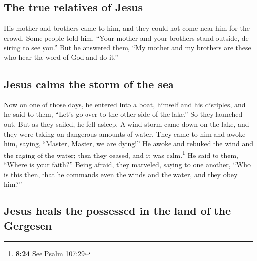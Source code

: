\begin{paracol}{2}
\begin{otherlanguage}{english}
\hypertarget{the-true-relatives-of-jesus}{%
\subsection{The true relatives of
Jesus}\label{the-true-relatives-of-jesus}}

 His mother and brothers came to him, and they could not
come near him for the crowd.  Some people told him,
``Your mother and your brothers stand outside, desiring to see you.''
 But he answered them, ``My mother and my brothers are
these who hear the word of God and do it.''

\hypertarget{jesus-calms-the-storm-of-the-sea}{%
\subsection{Jesus calms the storm of the
sea}\label{jesus-calms-the-storm-of-the-sea}}

 Now on one of those days, he entered into a boat,
himself and his disciples, and he said to them, ``Let's go over to the
other side of the lake.'' So they launched out.  But as
they sailed, he fell asleep. A wind storm came down on the lake, and
they were taking on dangerous amounts of water.  They
came to him and awoke him, saying, ``Master, Master, we are dying!'' He
awoke and rebuked the wind and the raging of the water; then they
ceased, and it was calm.\footnote{\textbf{8:24} See Psalm 107:29}
 He said to them, ``Where is your faith?'' Being afraid,
they marveled, saying to one another, ``Who is this then, that he
commands even the winds and the water, and they obey him?''

\hypertarget{jesus-heals-the-possessed-in-the-land-of-the-gergesen}{%
\subsection{Jesus heals the possessed in the land of the
Gergesen}\label{jesus-heals-the-possessed-in-the-land-of-the-gergesen}}


\end{otherlanguage}
\end{paracol}
